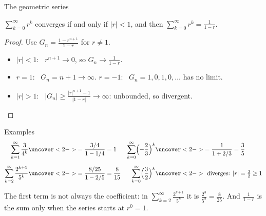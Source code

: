 \documentclass{wosm-slides}
\begin{document}
\begin{frame}{The geometric series}
  \begin{theorem}
    $\sum_{k=0}^{\infty} r^k$ converges if and only if $|r| < 1$, and then
    $\sum_{k=0}^{\infty} r^k = \frac{1}{1-r}$.
  \end{theorem}
  \pause
  \begin{proof}
    Use $G_n = \frac{1 - r^{n+1}}{1-r}$ for $r \ne 1$.
    \begin{itemize}
      \item $|r| < 1$: \ $r^{n+1} \to 0$, so $G_n \to \frac{1}{1-r}$.
      \item $r = 1$: \ $G_n = n + 1 \to \infty$. \quad
        $r = -1$: \ $G_n = 1, 0, 1, 0, \dots$ has no limit.
      \item $|r| > 1$: \ $|G_n| \ge \frac{|r|^{n+1} - 1}{|1 - r|} \to \infty$:
        unbounded, so divergent. \qedhere
    \end{itemize}
  \end{proof}
\end{frame}


\begin{frame}{Examples}
  \begin{align*}
    \sum_{k=1}^\infty \frac{3}{4^k}
      &\uncover<2->{= \frac{3/4}{1 - 1/4} = 1}
    & \sum_{k=0}^\infty \Bigl(-\frac23\Bigr)^k
      &\uncover<2->{= \frac{1}{1 + 2/3} = \frac35} \\[0.6em]
    \sum_{k=2}^\infty \frac{2^{k+1}}{5^k}
      &\uncover<2->{= \frac{8/25}{1 - 2/5} = \frac{8}{15}}
    & \sum_{k=0}^\infty \Bigl(\frac32\Bigr)^k
      &\uncover<2->{\ \text{diverges: } |r| = \tfrac32 \ge 1}
  \end{align*}
  \begin{warning}
    The first term is not always the coefficient: in $\sum_{k=2}^\infty \frac{2^{k+1}}{5^k}$
    it is $\frac{2^3}{5^2} = \frac{8}{25}$.
    And $\frac{1}{1-r}$ is the sum only when the series starts at $r^0 = 1$.
  \end{warning}
\end{frame}
\end{document}
